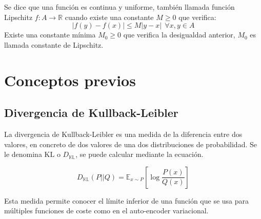 \begin{theorem}[Lipschitz]

    Se dice que una función es continua y uniforme, también llamada función Lipschitz ${f: A \rightarrow \mathbb{R}}$ cuando existe una constante ${M \geq 0}$ que verifica:
    $${\lvert f(y) - f(x)\rvert \leq M \lvert y-x \rvert ~~\forall x,y \in A}$$
    Existe una constante mínima ${M_{0}} \geq 0$ que verifica la desigualdad anterior, ${M_{0}}$ es llamada constante de Lipschitz.
    \label{theorem::lipschitz}
\end{theorem}


\section*{Conceptos previos}


\subsection*{Divergencia de Kullback-Leibler}
\label{subsection:divergencia-kl}

La divergencia de Kullback-Leibler es una medida de la diferencia entre dos valores, en concreto de dos valores de una dos distribuciones de probabilidad. Se le denomina ${\mathrm{KL}}$ o {$D_{\mathbb{KL}}$}, se puede calcular mediante la ecuación.

\begin{equation}
    D_{\mathbb{KL}}(P || Q) = \mathbb{E}_{x\sim{}P} \left[ \log{\frac{P(x)}{Q(x)}} \right]
    \label{eq:divergencia-kl}
\end{equation}

Esta medida permite conocer el límite inferior de una función que se usa para múltiples funciones de coste como en el auto-encoder variacional.